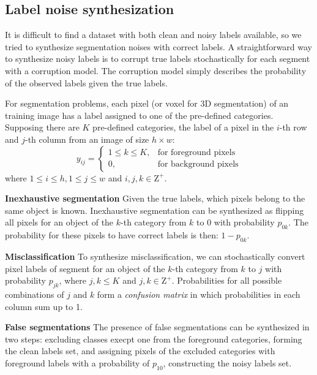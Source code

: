 \subsection{Label noise synthesization}
\label{subsec:noises}

It is difficult to find a dataset with both clean and noisy labels available, so we tried to synthesize segmentation noises with correct labels.
A straightforward way to synthesize noisy labels is to corrupt true labels stochastically for each segment with a corruption model.
The corruption model simply describes the probability of the observed labels given the true labels.

For segmentation problems, each pixel (or voxel for 3D segmentation) of an training image has a label assigned to one of the pre-defined categories.
Supposing there are $K$ pre-defined categories, the label of a pixel in the $i$-th row and $j$-th column from an image of size $h \times w$:
\[
  y_{ij} =
    \begin{cases}
      1 \leq k \leq K, & \text{for foreground pixels} \\
      0, & \text{for background pixels}
    \end{cases}
\]
where $1 \leq i \leq h, 1 \leq j \leq w$ and $i,j,k \in \mathrm{Z}^+$.


\textbf{Inexhaustive segmentation}
Given the true labels, which pixels belong to the same object is known.
Inexhaustive segmentation can be synthesized as flipping all pixels for an object of the $k$-th category from $k$ to $0$ with probability $p_{0k}$.
The probability for these pixels to have correct labels is then: $1-p_{0k}$.


\textbf{Misclassification}
To synthesize misclassification, we can stochastically convert pixel labels of segment for an object of the $k$-th category from $k$ to $j$ with probability $p_{jk}$, where $j, k \leq K$ and $j,k \in \mathrm{Z}^+$.
Probabilities for all possible combinations of $j$ and $k$ form a \textit{confusion matrix} in which probabilities in each column sum up to 1.

\textbf{False segmentations}
The presence of false segmentations can be synthesized in two steps: excluding classes execpt one from the foreground categories, forming the clean labels set, and assigning pixels of the excluded categories with foreground labels with a probability of $p_{10}$, constructing the noisy labels set.
